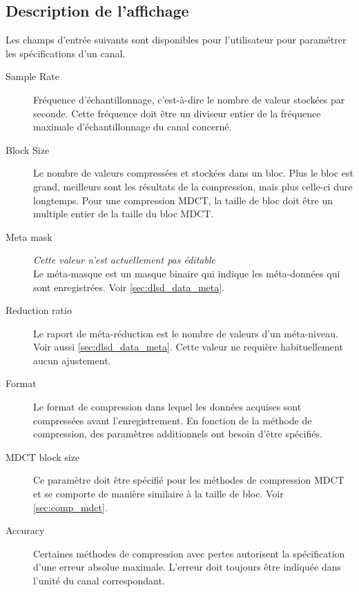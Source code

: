 \documentclass[a4paper,12pt,BCOR6mm,bibtotoc,idxtotoc]{scrbook}
\begin{document}

\subsection{Description de l'affichage}

Les champs d'entr\'ee suivants sont disponibles pour l'utilisateur
pour param\'etrer les sp\'ecifications d'un canal.

\begin{description}

\item[Sample Rate] Fr\'equence d'\'echantillonnage, c'est-\`a-dire le
  nombre de valeur stock\'ees par seconde. Cette fr\'equence doit
  \^etre un diviseur entier de la fr\'equence maximale
  d'\'echantillonnage du canal concern\'e.

\item[Block Size] Le nombre de valeurs compress\'ees et stock\'ees
  dans un bloc. Plus le bloc est grand, meilleurs sont les
  r\'esultats de la compression, mais plus celle-ci dure longtemps.
  Pour une compression MDCT, la taille de bloc doit \^etre un multiple
  entier de la taille du bloc MDCT.

\item[Meta mask] \textit{Cette valeur n'est actuellement pas
  \'editable}\\ Le m\'eta-masque est un masque binaire qui indique les
  m\'eta-donn\'ees qui sont enregistr\'ees. Voir
  \autoref{sec:dlsd_data_meta}.

\item[Reduction ratio] Le raport de m\'eta-r\'eduction est le nombre
  de valeurs d'un m\'eta-niveau. Voir aussi
  \autoref{sec:dlsd_data_meta}.  Cette valeur ne requi\`ere
  habituellement aucun ajustement.

\item[Format] Le format de compression dans lequel les donn\'ees
  acquises sont compress\'ees avant l'enregistrement.  En fonction de
  la m\'ethode de compression, des param\`etres additionnels ont
  besoin d'\^etre sp\'ecifi\'es.

\item[MDCT block size] Ce param\`etre doit \^etre sp\'ecifi\'e pour
  les m\'ethodes de compression MDCT et se comporte de mani\`ere
  similaire \`a la taille de bloc. Voir \autoref{sec:comp_mdct}.

\item[Accuracy] Certaines m\'ethodes de compression avec pertes
  autorisent la sp\'ecification d'une erreur absolue
  maximale. L'erreur doit toujours \^etre indiqu\'ee dans l'unit\'e du
  canal correspondant.

\end{description}
\end{document}
